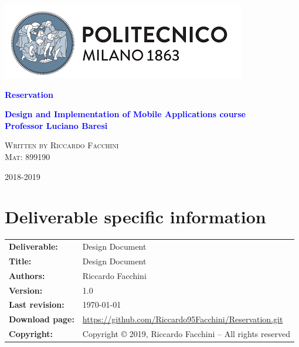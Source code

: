 


\begin{titlepage}
\centering
\includegraphics[scale=0.75]{Img/PolimiLogo}
\par\vspace{6cm}
{\textcolor{Blue}{\textbf{{\Huge Reservation}}}}
\par\vspace{1cm}
{\textcolor{Blue}{\textbf{{\Large Design and Implementation of Mobile Applications course \\ Professor Luciano Baresi}}}}
\par\vspace{3cm}
{\Large\scshape{Written by Riccardo Facchini \\Mat: 899190}}
\par\vfill
{\large 2018-2019}
\end{titlepage}
\clearpage
\section*{Deliverable specific information}
\begin{tabular}{ll}
\hline
\textbf{Deliverable:} & Design Document\\
\textbf{Title:} & Design Document \\
\textbf{Authors:} & Riccardo Facchini \\
\textbf{Version:} & 1.0 \\ 
\textbf{Last revision:} & \today \\
\textbf{Download page:} & \url{https://github.com/Riccardo95Facchini/Reservation.git} \\
\textbf{Copyright:} & Copyright © 2019, Riccardo Facchini – All rights reserved \\
\hline
\end{tabular}
\setcounter{page}{1}

